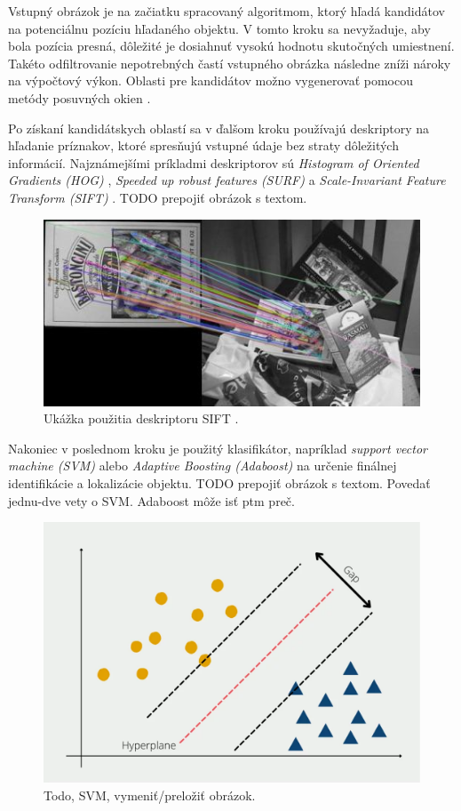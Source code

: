 Vstupný obrázok je na začiatku spracovaný algoritmom, ktorý hľadá kandidátov na potenciálnu pozíciu hľadaného objektu. V tomto kroku sa nevyžaduje, aby bola pozícia presná, dôležité je dosiahnuť vysokú hodnotu skutočných umiestnení. Takéto odfiltrovanie nepotrebných častí vstupného obrázka následne zníži nároky na výpočtový výkon. Oblasti pre kandidátov možno vygenerovať pomocou metódy  posuvných okien \cite{sel-search}.

Po získaní kandidátskych oblastí sa v ďalšom kroku používajú deskriptory na hľadanie príznakov, ktoré spresňujú vstupné údaje bez straty dôležitých informácií. Najznámejšími príkladmi deskriptorov sú \textit{Histogram of Oriented Gradients (HOG)} \cite{HOG}, \textit{Speeded up robust features (SURF)} \cite{SURF} a \textit{Scale-Invariant Feature Transform (SIFT)} \cite{SIFT}.
TODO prepojiť obrázok s textom.
\begin{figure}[H]
    \centering
    \includegraphics[width=.6\textwidth]{images/01/sift.jpeg}
    \caption{Ukážka použitia deskriptoru SIFT \cite{sift-img}.}
    \label{img:sift}
\end{figure}

Nakoniec v poslednom kroku je použitý klasifikátor, napríklad \textit{support vector machine (SVM)} \cite{SVM} alebo \textit{Adaptive Boosting (Adaboost)} \cite{Adaboost} na určenie finálnej identifikácie a lokalizácie objektu.
TODO prepojiť obrázok s textom. Povedať jednu-dve vety o SVM. Adaboost môže isť ptm preč.
\begin{figure}[H]
    \centering
    \includegraphics[width=.6\textwidth]{images/01/svm.png}
    \caption{Todo, SVM, vymeniť/preložiť obrázok.}
    \label{img:svm}
\end{figure}

